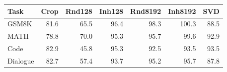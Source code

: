 \begin{tabular}{lrrrrrr}
\toprule
Task & Crop & Rnd128 & Inh128 & Rnd8192 & Inh8192 & SVD \\
\midrule
GSM8K & 81.6 & 65.5 & 96.4 & 98.3 & 100.3 & 88.5 \\
MATH & 78.8 & 70.0 & 95.3 & 95.7 & 99.6 & 92.9 \\
Code & 82.9 & 45.8 & 95.3 & 92.5 & 93.5 & 93.5 \\
Dialogue & 82.7 & 57.4 & 93.7 & 95.2 & 95.7 & 87.8 \\
\bottomrule
\end{tabular}
